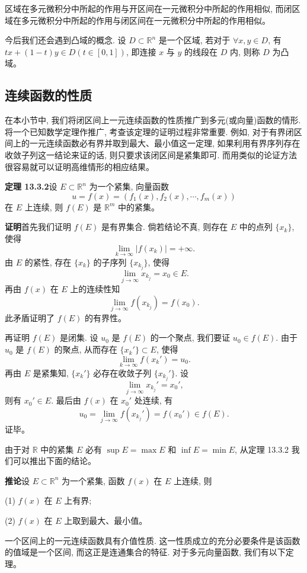 \documentclass[UTF8,12pt,a4paper,fontset=fandol]{ctexart}
\begin{document}
区域在多元微积分中所起的作用与开区间在一元微积分中所起的作用相似, 而闭区域在多元微积分中所起的作用与闭区间在一元微积分中所起的作用相似。

今后我们还会遇到凸域的概念. 设 $D\subset\mathbb R^n$ 是一个区域, 若对于 $\forall x,y\in D$, 有 $tx+(1-t)y\in D(t\in[0,1])$, 即连接 $x$ 与 $y$ 的线段在 $D$ 内, 则称 $D$ 为凸域。

\subsection{连续函数的性质}

在本小节中, 我们将闭区间上一元连续函数的性质推广到多元(或向量)函数的情形. 将一个已知数学定理作推广, 考查该定理的证明过程非常重要. 例如, 对于有界闭区间上的一元连续函数必有界并取到最大、最小值这一定理, 如果利用有界序列存在收敛子列这一结论来证的话, 则只要求该闭区间是紧集即可. 而用类似的论证方法很容易就可以证明高维情形的相应结果。

\noindent\textbf{定理 13.3.2}\quad 设 $E\subset\mathbb R^n$ 为一个紧集, 向量函数
\[
  u=f(x)=(f_1(x),f_2(x),\cdots,f_m(x))
\]
在 $E$ 上连续, 则 $f(E)$ 是 $\mathbb R^m$ 中的紧集。

\noindent\textbf{证明}\quad 首先我们证明 $f(E)$ 是有界集合. 倘若结论不真, 则存在 $E$ 中的点列 $\{x_k\}$, 使得
\[
  \lim_{k\to\infty}|f(x_k)|=+\infty.
\]
由 $E$ 的紧性, 存在 $\{x_k\}$ 的子序列 $\{x_{k_j}\}$, 使得
\[
  \lim_{j\to\infty}x_{k_j}=x_0\in E.
\]
再由 $f(x)$ 在 $E$ 上的连续性知
\[
  \lim_{j\to\infty}f(x_{k_j})=f(x_0).
\]
此矛盾证明了 $f(E)$ 的有界性。

再证明 $f(E)$ 是闭集. 设 $u_0$ 是 $f(E)$ 的一个聚点, 我们要证 $u_0\in f(E)$. 由于 $u_0$ 是 $f(E)$ 的聚点, 从而存在 $\{x_k'\}\subset E$, 使得
\[
  \lim_{k\to\infty}f(x_k')=u_0.
\]
再由 $E$ 是紧集知, $\{x_k'\}$ 必存在收敛子列 $\{x_{k_j}'\}$. 设
\[
  \lim_{j\to\infty}x_{k_j}'=x_0',
\]
则有 $x_0'\in E$. 最后由 $f(x)$ 在 $x_0'$ 处连续, 有
\[
  u_0=\lim_{j\to\infty}f(x_{k_j}')=f(x_0')\in f(E).
\]
证毕。

由于对 $\mathbb R$ 中的紧集 $E$ 必有 $\sup E=\max E$ 和 $\inf E=\min E$, 从定理 13.3.2 我们可以推出下面的结论。

\noindent\textbf{推论}\quad 设 $E\subset\mathbb R^n$ 为一个紧集, 函数 $f(x)$ 在 $E$ 上连续, 则

(1) $f(x)$ 在 $E$ 上有界;

(2) $f(x)$ 在 $E$ 上取到最大、最小值。

一个区间上的一元连续函数具有介值性质. 这一性质成立的充分必要条件是该函数的值域是一个区间, 而这正是连通集合的特征. 对于多元向量函数, 我们有以下定理。
\end{document}
